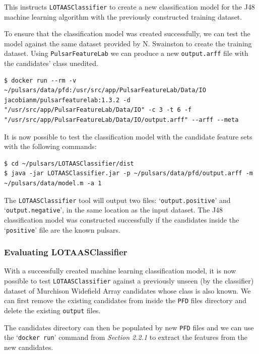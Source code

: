 \documentclass{article}
\begin{document}
This instructs \verb|LOTAASClassifier| to create a new classification model for the J48 machine learning algorithm with the previously constructed training dataset.

To ensure that the classification model was created successfully, we can test the model against the same dataset provided by N. Swainston to create the training dataset. Using \verb|PulsarFeatureLab| we can produce a new \verb|output.arff| file with the candidates' class unedited.

\begin{lstlisting}[numbers=none]
$ docker run --rm -v ~/pulsars/data/pfd:/usr/src/app/PulsarFeatureLab/Data/IO jacobianm/pulsarfeaturelab:1.3.2 -d "/usr/src/app/PulsarFeatureLab/Data/IO" -c 3 -t 6 -f "/usr/src/app/PulsarFeatureLab/Data/IO/output.arff" --arff --meta
\end{lstlisting}

It is now possible to test the classification model with the candidate feature sets with the following commands:

\begin{lstlisting}[numbers=none]
$ cd ~/pulsars/LOTAASClassifier/dist
$ java -jar LOTAASClassifier.jar -p ~/pulsars/data/pfd/output.arff -m ~/pulsars/data/model.m -a 1
\end{lstlisting}

The \verb|LOTAASClassifier| tool will output two files: `\verb|output.positive|' and `\verb|output.negative|', in the same location as the input dataset. The J48 classification model was constructed successfully if the candidates inside the `\verb|positive|' file are the known pulsars.

\subsubsection{Evaluating LOTAASClassifier}

With a successfully created machine learning classification model, it is now possible to test \verb|LOTAASClassifier| against a previously unseen (by the classifier) dataset of Murchison Widefield Array candidates whose class is also known. We can first remove the existing candidates from inside the \verb|PFD| files directory and delete the existing \verb|output| files.

The candidates directory can then be populated by new \verb|PFD| files and we can use the `\verb|docker run|' command from \emph{Section 2.2.1} to extract the features from the new candidates.
\end{document}
